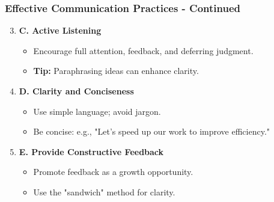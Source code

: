 \documentclass[aspectratio=169]{beamer}
\begin{document}
\begin{frame}[fragile]
    \frametitle{Effective Communication Practices - Continued}
    \begin{enumerate}
        \setcounter{enumi}{2} %
        \item \textbf{C. Active Listening}
            \begin{itemize}
                \item Encourage full attention, feedback, and deferring judgment.
                \item \textbf{Tip:} Paraphrasing ideas can enhance clarity.
            \end{itemize}

        \item \textbf{D. Clarity and Conciseness}
            \begin{itemize}
                \item Use simple language; avoid jargon.
                \item Be concise: e.g., "Let’s speed up our work to improve efficiency."
            \end{itemize}

        \item \textbf{E. Provide Constructive Feedback}
            \begin{itemize}
                \item Promote feedback as a growth opportunity.
                \item Use the "sandwich" method for clarity.
            \end{itemize}
    \end{enumerate}
\end{frame}
\end{document}
